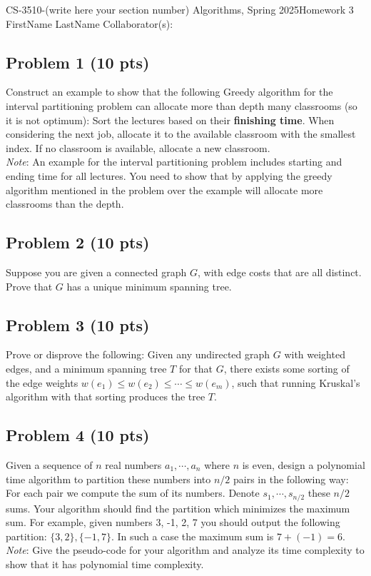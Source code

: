 \documentclass[12pt]{article}
\begin{document}
\noindent CS-3510-(write here your section number) Algorithms, Spring 2025\hfill Homework 3\\
FirstName LastName \hfill Collaborator(s):

\hrulefill

\subsection*{Problem 1 (10 pts)}
Construct an example to show that the following Greedy algorithm for the interval partitioning problem can allocate more than depth many classrooms (so it is not optimum): Sort the lectures based on their \textbf{finishing time}. When considering the next job, allocate it to the available classroom with the smallest index. If no classroom is available, allocate a new classroom. \\
\noindent \textit{Note}: An example for the interval partitioning problem includes starting and ending time for all lectures. You need to show that by applying the greedy algorithm mentioned in the problem over the example will allocate more classrooms than the depth.

\subsection*{Problem 2 (10 pts)}
Suppose you are given a connected graph $G$, with edge costs that are all distinct. Prove that $G$ has a unique minimum spanning tree.

\subsection*{Problem 3 (10 pts)}
Prove or disprove the following: Given any undirected graph $G$ with weighted edges, and a minimum spanning tree $T$ for that $G$, there exists some sorting of the edge weights $w(e_1) \le  w(e_2) \le \cdots \le w(e_m)$, such that running Kruskal’s algorithm with that sorting produces the tree $T$.\\

\subsection*{Problem 4 (10 pts)}
Given a sequence of $n$ real numbers $a_1 , \cdots, a_n$ where $n$ is even, design a polynomial time algorithm to partition these numbers into $n/2$ pairs in the following way: For each pair we compute the sum of its numbers. Denote $s_1, \cdots, s_{n/2}$ these $n/2$ sums. Your algorithm should find the partition which minimizes the maximum sum. For example, given numbers 3, -1, 2, 7 you should output the following partition: $\{3, 2\}, \{-1, 7\}$. In such a case the maximum sum is $7 + (-1) = 6$.\\
\textit{Note}: Give the pseudo-code for your algorithm and analyze its time complexity to show that it has polynomial time complexity.
\end{document}
